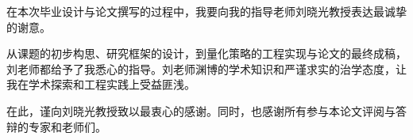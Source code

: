 
\begin{zhixie}

在本次毕业设计与论文撰写的过程中，我要向我的指导老师刘晓光教授表达最诚挚的谢意。

从课题的初步构思、研究框架的设计，到量化策略的工程实现与论文的最终成稿，刘老师都给予了我悉心的指导。刘老师渊博的学术知识和严谨求实的治学态度，让我在学术探索和工程实践上受益匪浅。

在此，谨向刘晓光教授致以最衷心的感谢。同时，也感谢所有参与本论文评阅与答辩的专家和老师们。

\end{zhixie}
